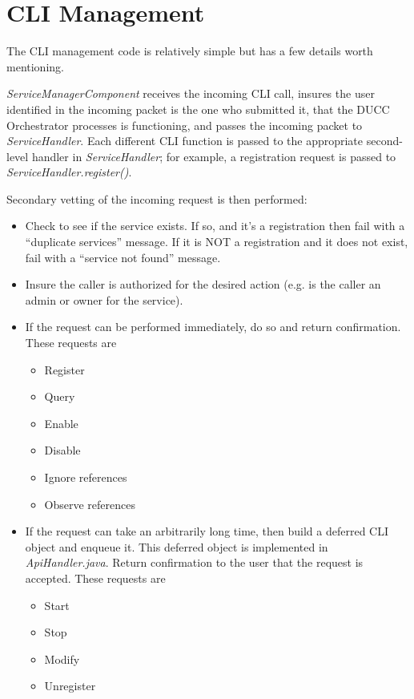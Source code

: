     \section{CLI Management}
    The CLI management code is relatively simple but has a few details worth mentioning.

    {\em ServiceManagerComponent} receives the incoming CLI call, insures the user identified
    in the incoming packet is the one who submitted it, that the DUCC Orchestrator processes
    is functioning, and passes the incoming packet to {\em ServiceHandler}.  Each different
    CLI function is passed to the appropriate second-level handler in {\em ServiceHandler}; for
    example, a registration request is passed to {\em ServiceHandler.register()}.

    Secondary vetting of the incoming request is then performed: 
    \begin{itemize}
      \item Check to see if the service exists.  If so, and it's a registration then fail with a
        ``duplicate services'' message.  If it is NOT a registration and it does not exist, fail with a
        ``service not found'' message.
      \item Insure the caller is authorized for the desired action (e.g. is the caller an
        admin or owner for the service).
      \item If the request can be performed immediately, do so and return confirmation.  These requests are
        \begin{itemize}
          \item Register
          \item Query
          \item Enable
          \item Disable
          \item Ignore references
          \item Observe references
        \end{itemize}
      \item If the request can take an arbitrarily long time, then build a deferred CLI object
        and enqueue it.  This deferred object is implemented in {\em ApiHandler.java}.  Return
        confirmation to the user that the request is accepted.  These requests are
        \begin{itemize}
          \item Start
          \item Stop
          \item Modify
          \item Unregister
        \end{itemize}
        
    \end{itemize}
      
